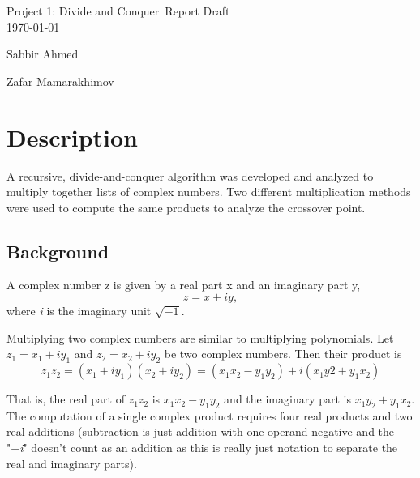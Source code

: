 \documentclass[usletter, 12pt]{article}
\newcommand{\project}{Project 1: Divide and Conquer}
\newcommand{\Sabbir}{Sabbir Ahmed}
\newcommand{\Zafar}{Zafar Mamarakhimov}
\begin{document}

    \begin{titlepage}

        \vspace*{\fill} %
        \begin{center}

            {\LARGE \project~Report Draft}\\ [1.5cm]

            \today
            
            \vspace*{\fill}

            \Sabbir

            \Zafar

        \end{center}
        \vspace*{\fill} %

    \end{titlepage}

    \section{Description}
    A recursive, divide-and-conquer algorithm was developed and analyzed to multiply together lists of complex numbers. Two different multiplication methods were used to compute the same products to analyze the crossover point.

        \subsection{Background}
        A complex number z is given by a real part x and an imaginary part y,
            \[ z=x+iy, \]
        where \textit{i} is the imaginary unit $\sqrt{-1}$.

        Multiplying two complex numbers are similar to multiplying polynomials. Let $z_{1}=x_{1}+iy_{1}$ and $z_{2}=x_{2}+iy_{2}$ be two complex numbers. Then their product is
            \[ z_{1}z_{2}=(x_{1}+iy_{1})(x_{2}+iy_{2})=(x_{1}x_{2}-y_{1}y_{2})+i(x_{1}y2+y_{1}x_{2}) \]

        That is, the real part of $z_{1}z_{2}$ is $x_{1}x_{2}-y_{1}y_{2}$ and the imaginary part is $x_{1}y_{2}+y_{1}x_{2}$. The computation of a single complex product requires four real products and two real additions (subtraction is just addition with one operand negative and the "+\textit{i}" doesn't count as an addition as this is really just notation to separate the real and imaginary parts).
\end{document}
